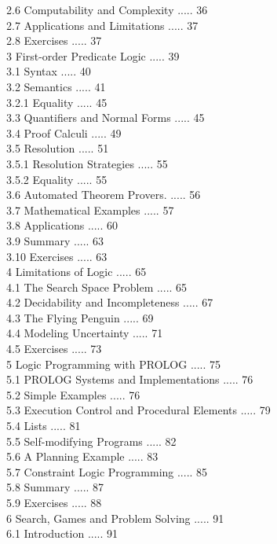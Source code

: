 \documentclass[10pt]{article}
\begin{document}
2.6 Computability and Complexity ..... 36\\
2.7 Applications and Limitations ..... 37\\
2.8 Exercises ..... 37\\
3 First-order Predicate Logic ..... 39\\
3.1 Syntax ..... 40\\
3.2 Semantics ..... 41\\
3.2.1 Equality ..... 45\\
3.3 Quantifiers and Normal Forms ..... 45\\
3.4 Proof Calculi ..... 49\\
3.5 Resolution ..... 51\\
3.5.1 Resolution Strategies ..... 55\\
3.5.2 Equality ..... 55\\
3.6 Automated Theorem Provers. ..... 56\\
3.7 Mathematical Examples ..... 57\\
3.8 Applications ..... 60\\
3.9 Summary ..... 63\\
3.10 Exercises ..... 63\\
4 Limitations of Logic ..... 65\\
4.1 The Search Space Problem ..... 65\\
4.2 Decidability and Incompleteness ..... 67\\
4.3 The Flying Penguin ..... 69\\
4.4 Modeling Uncertainty ..... 71\\
4.5 Exercises ..... 73\\
5 Logic Programming with PROLOG ..... 75\\
5.1 PROLOG Systems and Implementations ..... 76\\
5.2 Simple Examples ..... 76\\
5.3 Execution Control and Procedural Elements ..... 79\\
5.4 Lists ..... 81\\
5.5 Self-modifying Programs ..... 82\\
5.6 A Planning Example ..... 83\\
5.7 Constraint Logic Programming ..... 85\\
5.8 Summary ..... 87\\
5.9 Exercises ..... 88\\
6 Search, Games and Problem Solving ..... 91\\
6.1 Introduction ..... 91\\
\end{document}
